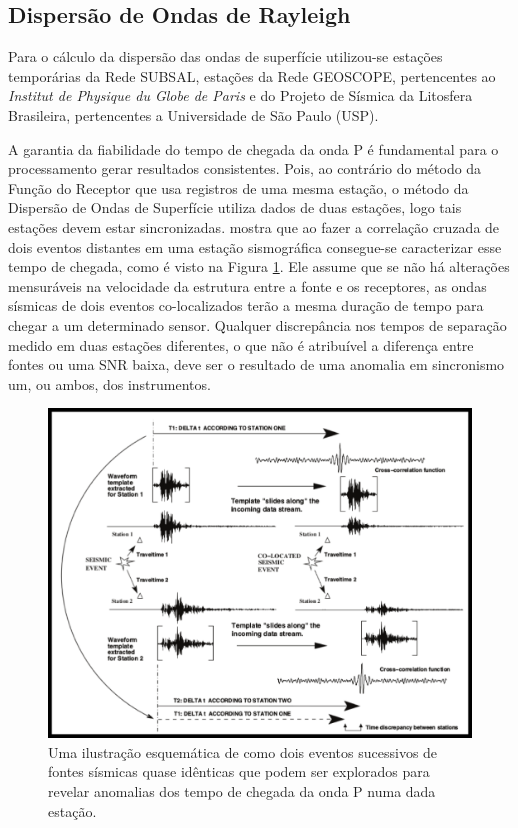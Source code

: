 \subsection{Dispersão de Ondas de Rayleigh}

Para o cálculo da dispersão das ondas de superfície utilizou-se estações temporárias da Rede SUBSAL, estações da Rede GEOSCOPE, pertencentes ao \textit{Institut de Physique du Globe de Paris} e do Projeto de Sísmica  da Litosfera Brasileira, pertencentes a Universidade de São Paulo (USP).

A garantia da fiabilidade do tempo de chegada da onda P é fundamental para o processamento gerar resultados consistentes. Pois, ao contrário do método da Função do Receptor que usa registros de uma mesma estação, o método da Dispersão de Ondas de Superfície utiliza dados de duas estações, logo tais estações devem estar sincronizadas. \cite{gibbons_identification_2006} mostra que ao fazer a correlação cruzada de dois eventos distantes em uma estação sismográfica consegue-se caracterizar esse tempo de chegada, como é visto na Figura \ref{teste_tempo}. Ele assume que se não há alterações mensuráveis na velocidade da estrutura entre a fonte e os receptores, as ondas sísmicas de dois eventos co-localizados terão a mesma duração de tempo para chegar a um determinado sensor. Qualquer discrepância nos tempos de separação medido em duas estações diferentes, o que não é atribuível a diferença entre fontes ou uma SNR baixa, deve ser o resultado de uma anomalia em sincronismo um, ou ambos, dos instrumentos.

\begin{figure}[!ht]
\centering
\includegraphics[scale=0.7]{Figs/correlacao_tempo_de_chegada.png}
\caption[Uma ilustração esquemática mostrando a correlação dos tempos de chegada da onda P.]{Uma ilustração esquemática de como dois eventos sucessivos de fontes sísmicas quase idênticas que podem ser explorados para revelar anomalias dos tempo de chegada da onda P numa dada estação. \cite{gibbons_identification_2006}}
\label{teste_tempo}
\end{figure}

